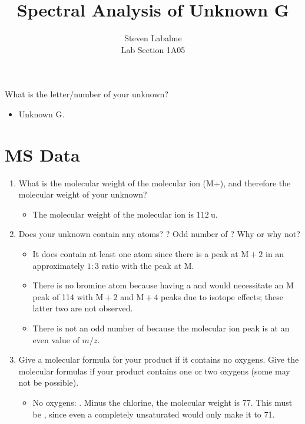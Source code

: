 \documentclass[titlepage]{article}
\title{Spectral Analysis of Unknown G}
\author{
    Steven Labalme\\
    \normalsize Lab Section 1A05
}
\begin{document}
\maketitle



\pagestyle{main}
\renewcommand{\leftmark}{Written Assignment 2}
\noindent What is the letter/number of your unknown?
\begin{itemize}
    \item Unknown G.
\end{itemize}



\section*{MS Data}
\begin{enumerate}
    \item What is the molecular weight of the molecular ion (M+), and therefore the molecular weight of your unknown?
    \begin{itemize}
        \item The molecular weight of the molecular ion is $\SI{112}{\atomicmassunit}$.
    \end{itemize}
    \item Does your unknown contain any  atoms? ? Odd number of ? Why or why not?
    \begin{itemize}
        \item It does contain at least one  atom since there is a peak at $\text{M}+2$ in an approximately $1:3$ ratio with the peak at M.
        \item There is no bromine atom because having a  and  would necessitate an M peak of 114 with $\text{M}+2$ and $\text{M}+4$ peaks due to isotope effects; these latter two are not observed.
        \item There is not an odd number of  because the molecular ion peak is at an even value of $m/z$.
    \end{itemize}
    \item Give a molecular formula for your product if it contains no oxygens. Give the molecular formulas if your product contains one or two oxygens (some may not be possible).
    \begin{itemize}
        \item No oxygens: . Minus the chlorine, the molecular weight is 77. This must be , since even a completely unsaturated  would only make it to 71.

\end{itemize}
\end{enumerate}
\end{document}
